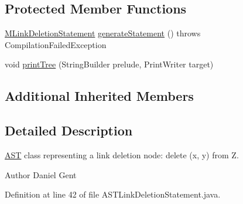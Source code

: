 \subsection*{Protected Member Functions}
\begin{DoxyCompactItemize}
\item 
\hyperlink{classorg_1_1tzi_1_1use_1_1uml_1_1sys_1_1soil_1_1_m_link_deletion_statement}{M\-Link\-Deletion\-Statement} \hyperlink{classorg_1_1tzi_1_1use_1_1parser_1_1soil_1_1ast_1_1_a_s_t_link_deletion_statement_a7d810325905e11b0f9af725d08f09ce0}{generate\-Statement} ()  throws Compilation\-Failed\-Exception 
\item 
void \hyperlink{classorg_1_1tzi_1_1use_1_1parser_1_1soil_1_1ast_1_1_a_s_t_link_deletion_statement_a0c096648e243486ef06da3bd202d7deb}{print\-Tree} (String\-Builder prelude, Print\-Writer target)
\end{DoxyCompactItemize}
\subsection*{Additional Inherited Members}


\subsection{Detailed Description}
\hyperlink{classorg_1_1tzi_1_1use_1_1parser_1_1_a_s_t}{A\-S\-T} class representing a link deletion node\-: {\ttfamily delete (x, y) from Z}. \begin{DoxyAuthor}{Author}
Daniel Gent 
\end{DoxyAuthor}


Definition at line 42 of file A\-S\-T\-Link\-Deletion\-Statement.\-java.



